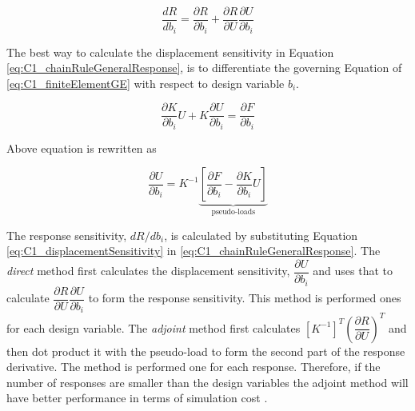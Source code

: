 \begin{equation}\label{eq:C1_chainRuleGeneralResponse}
	\frac{dR}{db_i} = \frac{\partial R}{\partial b_i} + 
	                  \frac{\partial R}{\partial U} \frac{\partial U}{\partial b_i}
\end{equation}

The best way to calculate the displacement sensitivity in Equation \eqref{eq:C1_chainRuleGeneralResponse}, is to differentiate the governing Equation of \eqref{eq:C1_finiteElementGE} with respect to design variable $b_i$. 

\begin{equation*}
	\frac{\partial K}{\partial b_i} U + K \frac{\partial U}{\partial b_i} = \frac{\partial F}{\partial b_i}
\end{equation*}

Above equation is rewritten as

\begin{equation}\label{eq:C1_displacementSensitivity}
	\frac{\partial U}{\partial b_i} = 
	K^{-1} \underbrace{\left[ \frac{\partial F}{\partial b_i} - \frac{\partial K}{\partial b_i} U \right]}_\text{pseudo-loads}
\end{equation}

The response sensitivity, $dR/db_i$, is calculated by substituting Equation \eqref{eq:C1_displacementSensitivity} in \eqref{eq:C1_chainRuleGeneralResponse}. The \emph{direct} method first calculates the displacement sensitivity, $\dfrac{\partial U}{\partial b_i}$ and uses that to calculate $\dfrac{\partial R}{\partial U} \dfrac{\partial U}{\partial b_i}$ to form the response sensitivity. This method is performed ones for each design variable. The \emph{adjoint} method first calculates $[K^{-1}]^T \left( \dfrac{\partial R}{\partial U}\right)^T$ and then dot product it with the pseudo-load to form the second part of the response derivative. The method is performed one for each response. Therefore, if the number of responses are smaller than the design variables the adjoint method will have better performance in terms of simulation cost \cite{vanderplaats1984numerical}.

